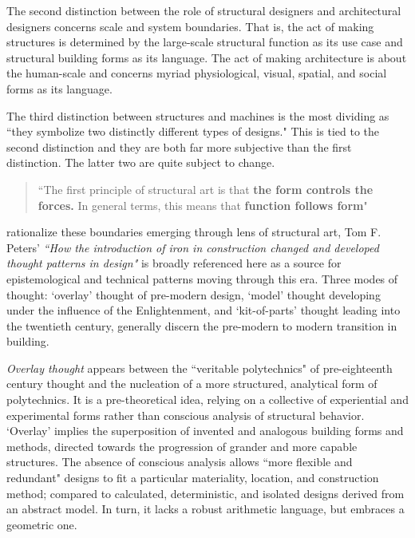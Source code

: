 The second distinction between the role of structural designers and architectural designers concerns scale and system boundaries. That is, the act of making structures is determined by the large-scale structural function as its use case and structural building forms as its language. The act of making architecture is about the human-scale and concerns myriad physiological, visual, spatial, and social forms as its language.

The third distinction between structures and machines is the most dividing as ``they symbolize two distinctly different types of designs." This is tied to the second distinction and they are both far more subjective than the first distinction. The latter two are quite subject to change.

\begin{quote}
  ``The first principle of structural art is that {\large{\textbf{the form controls the forces.}}} In general terms, this means that {\large{\textbf{function follows form}}}" \cite[p87]{TOWERANDBRIDGE}
\end{quote}





rationalize these boundaries emerging through lens of structural art, Tom F. Peters' \textit{``How the introduction of iron in construction changed and developed thought patterns in design"} is broadly referenced here as a source for epistemological and technical patterns moving through this era. Three modes of thought: `overlay' thought \cite[36]{IRON} of pre-modern design, `model' thought \cite[37]{IRON} developing under the influence of the Enlightenment, and `kit-of-parts' thought \cite[53]{IRON} leading into the twentieth century, generally discern the pre-modern to modern transition in building.

\textit{Overlay thought} appears between the ``veritable polytechnics" of pre-eighteenth century thought and the nucleation of a more structured, analytical form of polytechnics. It is a pre-theoretical idea, relying on a collective of experiential and experimental forms rather than conscious analysis of structural behavior. `Overlay' implies the superposition of invented and analogous building forms and methods, directed towards the progression of grander and more capable structures. The absence of conscious analysis allows ``more flexible and redundant" designs to fit a particular materiality, location, and construction method; compared to calculated, deterministic, and isolated designs derived from an abstract model. \cite[p36, 37]{IRON} In turn, it lacks a robust arithmetic language, but embraces a geometric one.

